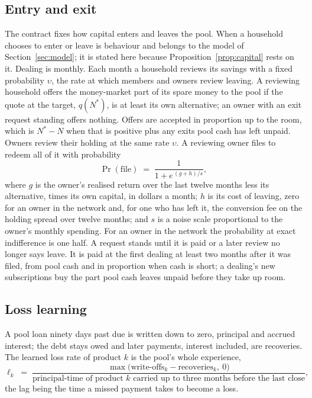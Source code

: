 \documentclass[10pt,a4paper]{article}
\theoremstyle{remark}
\begin{document}
\subsection{Entry and exit}
\label{sec:entry}
The contract fixes how capital enters and leaves the pool. When a household
chooses to enter or leave is behaviour and belongs to the model of
Section~\ref{sec:model}; it is stated here because
Proposition~\ref{prop:capital} rests on it.
Dealing is monthly. Each month a household reviews its savings with a fixed
probability \(\upsilon\), the rate at which members and owners review
leaving. A
reviewing household offers the money-market part of its spare money to the
pool if the quote at the target, \(q(N^{*})\), is at least its own
alternative; an owner with an exit request standing offers nothing. Offers
are accepted in proportion up to the room, which is \(N^{*}-N\) when that is
positive plus any exits pool cash has left unpaid. Owners review their
holding at the same rate \(\upsilon\). A reviewing owner files to redeem all
of it with probability
\begin{equation}
\Pr(\text{file}) \;=\; \frac{1}{1+e^{\,(g+h)/s}},
\label{eq:exit}
\end{equation}
where \(g\) is the owner's realised return over the last twelve months less
its alternative, times its own capital, in dollars a month; \(h\) is its cost
of leaving, zero for an owner in the network and, for one who has left it,
the conversion fee on the holding spread over twelve months; and \(s\) is a
noise scale proportional to the owner's monthly spending. For an owner in the
network the probability at exact indifference is one half. A request stands
until it is paid or a later review no longer says leave. It is paid at
the first dealing at least two months after it was filed, from pool cash and
in proportion when cash is short; a dealing's new subscriptions buy the
part pool cash leaves unpaid before they take up room.

\subsection{Loss learning}
\label{sec:loss}
A pool loan ninety days past due is written down to zero, principal
and accrued interest; the debt stays owed and later payments, interest
included, are recoveries. The learned loss rate of product \(k\) is the
pool's whole experience,
\begin{equation}
\ell_k \;=\; \frac{\max\bigl(\text{write-offs}_k-\text{recoveries}_k,\ 0\bigr)}
{\text{principal-time of product }k\text{ carried up to three months before the last close}} ,
\label{eq:loss}
\end{equation}
the lag being the time a missed payment takes to become a loss.
\end{document}
